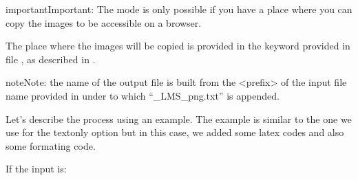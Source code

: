 \documentclass[letterpaper,10pt,english]{sphinxmanual}
\begin{document}
\begin{sphinxadmonition}{important}{Important:}
The  mode is only possible if you have a place where you can copy the images to be accessible on a browser.
\end{sphinxadmonition}

The place where the images will be copied is provided in the keyword  provided in file , as described in {\hyperref[\detokenize{usage:config-label}]{}}.

\begin{sphinxadmonition}{note}{Note:}
the name of the output file is built from the \textless{}prefix\textgreater{} of the input file name provided in  under  to which “\_LMS\_png.txt” is appended.
\end{sphinxadmonition}

Let’s describe the process using an example. The example is similar to the one we use for the text\sphinxhyphen{}only option but in this case, we added some latex codes and also some formating code.

If the input is:
\end{document}
